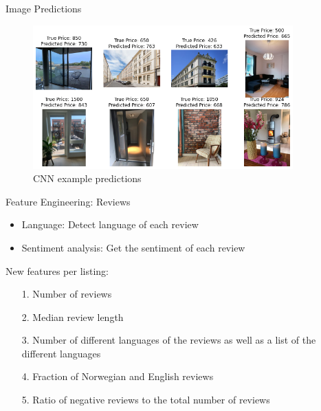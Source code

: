 \documentclass[ngerman,inputenc]{beamer}
\begin{document}
\begin{frame}{Image Predictions}

  \begin{figure}[H]
    \centering
    \includegraphics[width=10cm]{cnn_examples_medium.png}
    \caption{CNN example predictions}
  \end{figure}

\end{frame}


\begin{frame}{Feature Engineering: Reviews}
  \begin{itemize}
    \item Language: Detect language of each review
    \item Sentiment analysis: Get the sentiment of each review
  \end{itemize}

  \pause

  \hspace{5pt}

  New features per listing:
  \begin{itemize}
    \item[1.] Number of reviews
    \item[2.] Median review length
    \item[3.] Number of different languages of the reviews as well as a list of the different languages
    \item[4.] Fraction of Norwegian and English reviews
    \item[5.] Ratio of negative reviews to the total number of reviews
  \end{itemize}

\end{frame}
\end{document}
